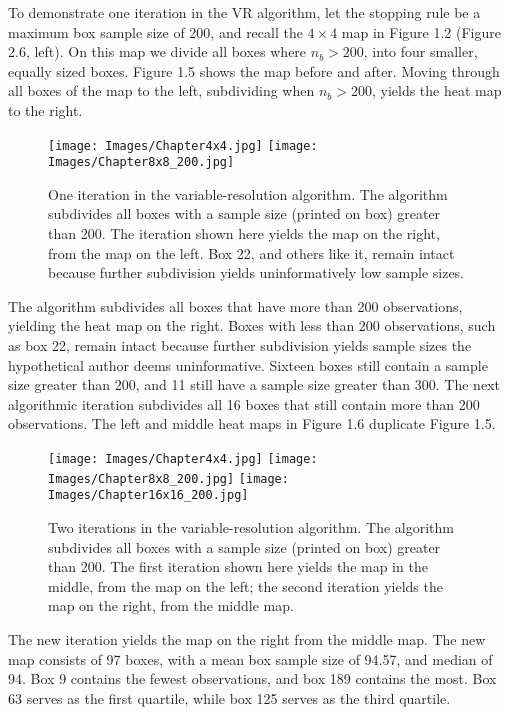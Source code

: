 To demonstrate one iteration in the VR algorithm, let the stopping rule be a maximum box sample size of 200, and recall the $4 \times 4$ map in Figure 1.2 (Figure 2.6, left). On this map we divide all boxes where $n_{b} > 200$, into four smaller, equally sized boxes. Figure 1.5 shows the map before and after. Moving through all boxes of the map to the left, subdividing when $n_{b} > 200$, yields the heat map to the right.
        \begin{figure}[H]
      	\centering
      	\texttt{[image: Images/Chapter4x4.jpg]} 
      	\texttt{[image: Images/Chapter8x8\_200.jpg]} 
      	\caption{One iteration in the variable-resolution algorithm. The algorithm subdivides all boxes with a sample size (printed on box) greater than 200. The iteration shown here yields the map on the right, from the map on the left. Box 22, and others like it, remain intact because further subdivision yields uninformatively low sample sizes.}
      	\end{figure} 
The algorithm subdivides all boxes that have more than 200 observations, yielding the heat map on the right. Boxes with less than 200 observations, such as box 22, remain intact because further subdivision yields sample sizes the hypothetical author deems uninformative. Sixteen boxes still contain a sample size greater than 200, and 11 still have a sample size greater than 300. The next algorithmic iteration subdivides all 16 boxes that still contain more than 200 observations. The left and middle heat maps in Figure 1.6 duplicate Figure 1.5. %
        \begin{figure}[H]
      	\centering
      	\texttt{[image: Images/Chapter4x4.jpg]}
      	\texttt{[image: Images/Chapter8x8\_200.jpg]} 
      	\texttt{[image: Images/Chapter16x16\_200.jpg]} 
      	\caption{Two iterations in the variable-resolution algorithm. The algorithm subdivides all boxes with a sample size (printed on box) greater than 200. The first iteration shown here yields the map in the middle, from the map on the left; the second iteration yields the map on the right, from the middle map.}
      	\end{figure}
The new iteration yields the map on the right from the middle map. The new map consists of 97 boxes, with a mean box sample size of 94.57, and median of 94. Box 9 contains the fewest observations, and box 189 contains the most. Box 63 serves as the first quartile, while box 125 serves as the third quartile. 

